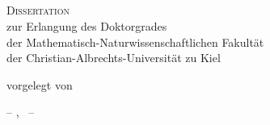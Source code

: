 \begin{titlepage}
\setlength{\hoffset}{0mm}
	\begin{addmargin}[-1cm]{-3cm}
    \begin{center}
        \large  

        \hfill

        \vfill

        \begingroup
            \hrulefill\\
            \vspace{.6cm}
            {\LARGE\myTitle} \\[0.3cm] 
	    	{\Large\mySubtitle} \\ 
        	\vspace{.1cm}
            \hrulefill\\
        \endgroup
	\vspace{1.5cm}
	\vspace{7.2cm}
    {\Large\textsc{Dissertation}}\\
	\vspace{.6cm}
        \begingroup
	    zur Erlangung des Doktorgrades\\
	    der Mathematisch-Naturwissenschaftlichen Fakult\"at\\
	    der Christian-Albrechts-Universit\"at zu Kiel
	\vspace{1.2cm}
        \endgroup     

	{	    
        vorgelegt von\\[0.3cm]
        \Large\textcolor{Maroon}{\myName}
    }

        \vfill

        

	\vspace{3cm}
        -- \myLocation, \myTime\ --
        \vfill                      

    \end{center}  
  \end{addmargin}       
\end{titlepage}   